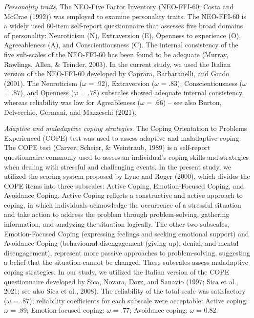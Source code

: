 \documentclass[
  man]{apa6}
\begin{document}
\emph{Personality traits}. The NEO-Five Factor Inventory (NEO-FFI-60; Costa and McCrae (1992)) was employed to examine personality traits. The NEO-FFI-60 is a widely used 60-item self-report questionnaire that assesses five broad domains of personality: Neuroticism (N), Extraversion (E), Openness to experience (O), Agreeableness (A), and Conscientiousness (C). The internal consistency of the five sub-scales of the NEO-FFI-60 has been found to be adequate (Murray, Rawlings, Allen, \& Trinder, 2003). In the current study, we used the Italian version of the NEO-FFI-60 developed by Caprara, Barbaranelli, and Guido (2001). The Neuroticism (\(\omega\) = .92), Extraversion (\(\omega\) = .83), Conscientiousness (\(\omega\) = .87), and Openness (\(\omega\) = .78) subscales showed adequate internal consistency, whereas reliability was low for Agreableness (\(\omega\) = .66) -- see also Burton, Delvecchio, Germani, and Mazzeschi (2021).

\emph{Adaptive and maladaptive coping strategies}. The Coping Orientation to Problems Experienced (COPE) test was used to assess adaptive and maladaptive coping. The COPE test (Carver, Scheier, \& Weintraub, 1989) is a self-report questionnaire commonly used to assess an individual's coping skills and strategies when dealing with stressful and challenging events. In the present study, we utilized the scoring system proposed by Lyne and Roger (2000), which divides the COPE items into three subscales: Active Coping, Emotion-Focused Coping, and Avoidance Coping. Active Coping reflects a constructive and active approach to coping, in which individuals acknowledge the occurrence of a stressful situation and take action to address the problem through problem-solving, gathering information, and analyzing the situation logically. The other two subscales, Emotion-Focused Coping (expressing feelings and seeking emotional support) and Avoidance Coping (behavioural disengagement (giving up), denial, and mental disengagement), represent more passive approaches to problem-solving, suggesting a belief that the situation cannot be changed. These subscales assess maladaptive coping strategies. In our study, we utilized the Italian version of the COPE questionnaire developed by Sica, Novara, Dorz, and Sanavio (1997; Sica et al., 2021; see also Sica et al., 2008). The reliability of the total scale was satisfactory (\(\omega\) = .87); reliability coefficients for each subscale were acceptable: Active coping: \(\omega\) = .89; Emotion-focused coping: \(\omega\) = .77; Avoidance coping: \(\omega\) = 0.82.
\end{document}
